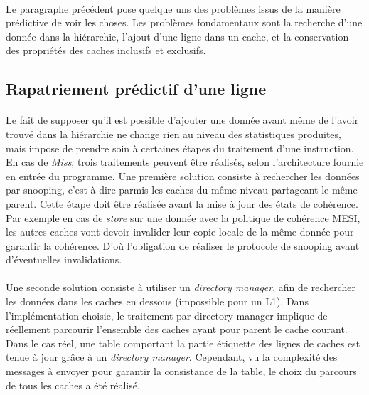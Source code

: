 \paragraph{}
Le paragraphe précédent pose quelque uns des problèmes issus de la manière prédictive de voir les choses. Les problèmes fondamentaux sont la recherche d'une donnée dans la hiérarchie, l'ajout d'une ligne dans un cache, et la conservation des propriétés des caches inclusifs et exclusifs.

\subsection{Rapatriement prédictif d'une ligne}

\paragraph{}
Le fait de supposer qu'il est possible d'ajouter une donnée avant même de l'avoir trouvé dans la hiérarchie ne change rien au niveau des statistiques produites, mais impose de prendre soin à certaines étapes du traitement d'une instruction. En cas de \emph{Miss}, trois traitements peuvent être réalisés, selon l'architecture fournie en entrée du programme. Une première solution consiste à rechercher les données par snooping, c'est-à-dire parmis les caches du même niveau partageant le même parent. Cette étape doit être réalisée avant la mise à jour des états de cohérence. Par exemple en cas de \emph{store} sur une donnée avec la politique de cohérence MESI, les autres caches vont devoir invalider leur copie locale de la même donnée pour garantir la cohérence. D'où l'obligation de réaliser le protocole de snooping avant d'éventuelles invalidations.

\paragraph{}
Une seconde solution consiste à utiliser un \emph{directory manager}, afin de rechercher les données dans les caches en dessous (impossible pour un L1). Dans l'implémentation choisie, le traitement par directory manager implique de réellement parcourir l'ensemble des caches ayant pour parent le cache courant. Dans le cas réel, une table comportant la partie étiquette des lignes de caches est tenue à jour grâce à un \emph{directory manager}. Cependant, vu la complexité des messages à envoyer pour garantir la consistance de la table, le choix du parcours de tous les caches a été réalisé.

